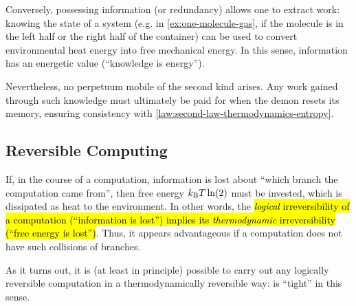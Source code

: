 Conversely, possessing information (or redundancy) allows one to extract work: 
knowing the state of a system (e.g. in \autoref{ex:one-molecule-gas}, if the molecule is in the left half or the right half of the container) can be used to convert environmental heat energy into free mechanical energy. 
In this sense, information has an energetic value (``knowledge is energy'').

Nevertheless, no perpetuum mobile of the second kind arises. 
Any work gained through such knowledge must ultimately be paid for when the demon resets its memory, ensuring consistency with \autoref{law:second-law-thermodynamics-entropy}.








\subsection{Reversible Computing}
\label{sec:reversible-computing}

If, in the course of a computation, information is lost about ``which branch the computation came from'', then free energy $k_{\mathrm{B}} T \ln(2)$ must be invested, which is dissipated as heat to the environment.
In other words, the \hl{\emph{logical} irreversibility of a computation (``information is lost'') implies its \emph{thermodynamic} irreversibility (``free energy is lost'')}.
Thus, it appears advantageous if a computation does not have such collisions of branches.

As it turns out, it is (at least in principle) possible to carry out any logically reversible computation in a thermodynamically reversible way: 
 is {``tight''} in this sense.








